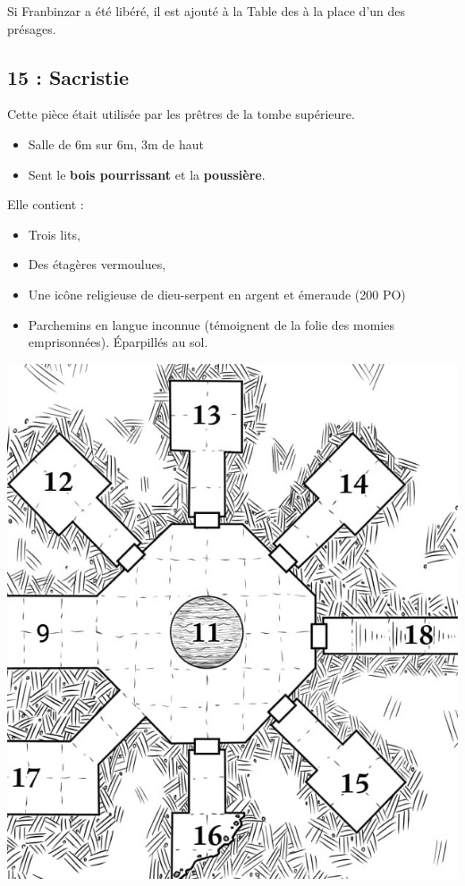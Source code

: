 Si Franbinzar a été libéré, il est ajouté à la Table des \textbf{} à la place d’un des présages.

\subsection{15 : Sacristie}\label{n2:s15}
Cette pièce était utilisée par les prêtres de la tombe supérieure.
\begin{itemize}
  \item Salle de 6m sur 6m, 3m de haut
  \item Sent le \textbf{bois pourrissant} et la \textbf{poussière}.
\end{itemize}
Elle contient :
\begin{itemize}
    \item Trois lits,
    \item Des étagères vermoulues,
    \item Une icône religieuse de dieu-serpent en argent et émeraude (200 PO)
    \item Parchemins en langue inconnue (témoignent de la folie des momies emprisonnées).
          Éparpillés au sol.
\end{itemize}

\includegraphics[width=\linewidth]{pics/map_11-18.jpg}

